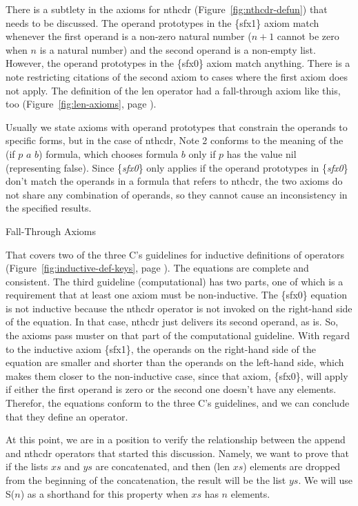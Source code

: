 \begin{aside}
There is a subtlety in the axioms for nthcdr (Figure~\ref{fig:nthcdr-defun})
that needs to be discussed.
The operand prototypes in the
\{sfx1\} axiom match whenever the first operand is a non-zero natural number
($n+1$ cannot be zero when $n$ is a natural number)
and the second operand is a non-empty list.
However, the operand prototypes in the \{sfx0\} axiom match anything.
There is a note restricting
citations of the second axiom to cases
where the first axiom does not apply.
The definition of the len operator 
had a fall-through axiom like this, too
(Figure~\ref{fig:len-axioms}, page \pageref{fig:len-axioms}).

Usually we state axioms with operand prototypes that constrain
the operands to specific forms, 
but in the case of nthcdr, Note 2 conforms to the meaning
of the (if $p$ $a$ $b$) formula, which chooses formula $b$
only if $p$ has the value nil (representing false).
Since \{\emph{sfx0}\} only applies if the operand prototypes in 
\{\emph{sfx0}\} don't match the operands in a formula that refers to nthcdr,
the two axioms do not share any combination of operands, so they cannot
cause an inconsistency in the specified results.
\caption{Fall-Through Axioms}
\label{fig:fall-through-axioms}
\end{aside}

That covers two of the three C's guidelines for inductive definitions of operators
(Figure~\ref{fig:inductive-def-keys}, page \pageref{fig:inductive-def-keys}).
The equations are complete and consistent.
The third guideline (computational) has two parts, one of which is
a requirement that at least one axiom must be non-inductive.
The \{sfx0\} equation is not inductive because the nthcdr operator
is not invoked on the right-hand side of the equation.
In that case, nthcdr just delivers its second operand, as is.
So, the axioms pass muster on that part of the computational guideline.
With regard to the inductive axiom \{sfx1\},
the operands on the right-hand side of the equation are
smaller and shorter than the operands on the left-hand side,
which makes them closer to the non-inductive case,
since that axiom, \{sfx0\}, will apply if either the first
operand is zero or the second one doesn't have any elements.
Therefor, the equations conform to the three C's guidelines,
and we can conclude that they define an operator.

At this point, we are in a position to verify the relationship
between the append and nthcdr operators that started this discussion.
Namely, we want to prove that if the lists $xs$ and $ys$ are concatenated,
and then (len $xs$) elements are dropped from the beginning of the
concatenation, the result will be the list $ys$.
We will use S($n$) as a shorthand for this property
when $xs$ has $n$ elements.

